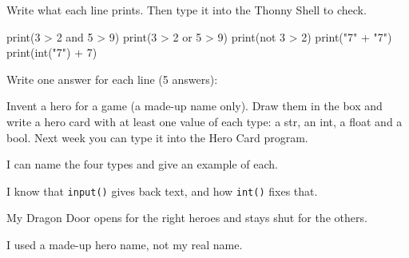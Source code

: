\begin{challenge}
Write what each line prints. Then type it into the Thonny Shell to check.
\begin{pycode}
print(3 > 2 and 5 > 9)
print(3 > 2 or 5 > 9)
print(not 3 > 2)
print("7" + "7")
print(int("7") + 7)
\end{pycode}
Write one answer for each line (5 answers):
\end{challenge}

\begin{creative}
Invent a hero for a game (a made-up name only). Draw them in the box and write a hero card with at least
one value of each type: a str, an int, a float and a bool. Next week you can type it into the Hero Card program.
\answerspace{4cm}
\end{creative}

\begin{selfcheck}
  \item I can name the four types and give an example of each.
  \item I know that \texttt{input()} gives back text, and how \texttt{int()} fixes that.
  \item My Dragon Door opens for the right heroes and stays shut for the others.
  \item I used a made-up hero name, not my real name.
\end{selfcheck}
